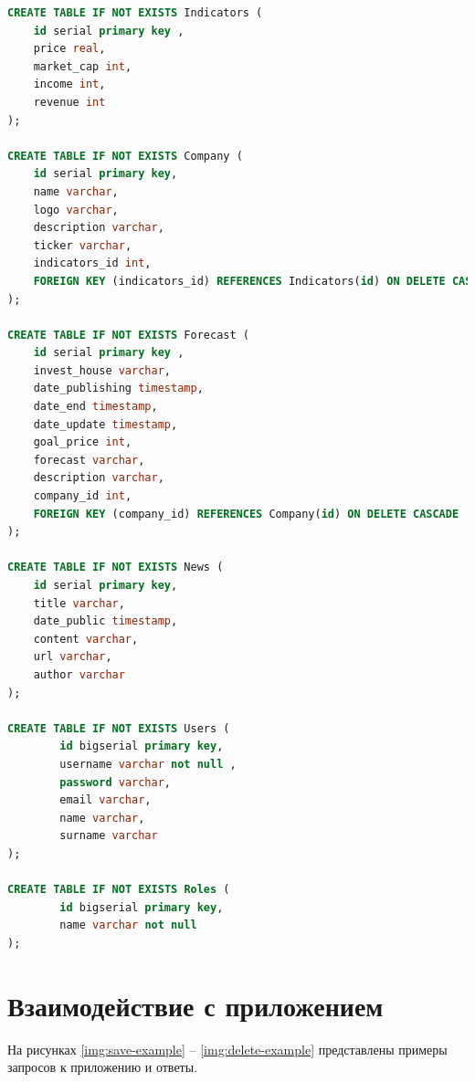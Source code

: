 \begin{lstlisting}[label=lst:sql1, caption=Создание таблиц, language=sql]
CREATE TABLE IF NOT EXISTS Indicators (
	id serial primary key ,
	price real,
	market_cap int,
	income int,
	revenue int
);

CREATE TABLE IF NOT EXISTS Company (
	id serial primary key,
	name varchar,
	logo varchar,
	description varchar,
	ticker varchar,
	indicators_id int,
	FOREIGN KEY (indicators_id) REFERENCES Indicators(id) ON DELETE CASCADE
);

CREATE TABLE IF NOT EXISTS Forecast (
	id serial primary key ,
	invest_house varchar,
	date_publishing timestamp,
	date_end timestamp,
	date_update timestamp,
	goal_price int,
	forecast varchar,
	description varchar,
	company_id int,
	FOREIGN KEY (company_id) REFERENCES Company(id) ON DELETE CASCADE
);

CREATE TABLE IF NOT EXISTS News (
	id serial primary key,
	title varchar,
	date_public timestamp,
	content varchar,
	url varchar,
	author varchar
);

CREATE TABLE IF NOT EXISTS Users (
		id bigserial primary key,
		username varchar not null ,
		password varchar,
		email varchar,
		name varchar,
		surname varchar
);

CREATE TABLE IF NOT EXISTS Roles (
		id bigserial primary key,
		name varchar not null
);	
\end{lstlisting}
	
	


\section{Взаимодействие с приложением}

На рисунках \ref{img:save-example} -- \ref{img:delete-example} представлены примеры запросов к приложению и ответы.

